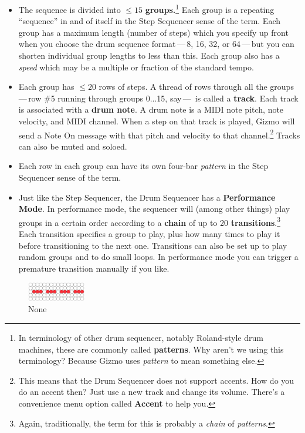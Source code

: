 \documentclass{article}
\begin{document}
\begin{itemize} 
\item The sequence is divided into \(\leq 15\) {\bf groups.}\footnote{In terminology of other drum sequencer, notably Roland-style drum machines, these are commonly called {\bf patterns}.  Why aren't we using this terminology?  Because Gizmo uses {\it pattern} to mean something else.} Each group is a repeating ``sequence'' in and of itself in the Step Sequencer sense of the term.  Each group has a maximum length (number of steps) which you specify up front when you choose the drum sequence format\,---\,8, 16, 32, or 64\,---\,but you can shorten individual group lengths to less than this.  Each group also has a {\it speed} which may be a multiple or fraction of the standard tempo.
\item Each group has \(\leq 20\) rows of steps.  A thread of rows through all the groups\,---\,row \#5 running through groups 0...15, say\,---\, is called a {\bf track}.  Each track is associated with a {\bf drum note}.  A drum note is a MIDI note pitch, note velocity, and MIDI channel.  When a step on that track is played, Gizmo will send a Note On message with that pitch and velocity to that channel.\footnote{This means that the Drum Sequencer does not support accents.  How do you do an accent then?  Just use a new track and change its volume.  There's a convenience menu option called {\bf Accent} to help you.} Tracks can also be muted and soloed.
\item Each row in each group can have its own four-bar {\it pattern} in the Step Sequencer sense of the term.
\item Just like the Step Sequencer, the Drum Sequencer has a {\bf Performance Mode}.  In performance mode, the sequencer will (among other things) play groups in a certain order according to a {\bf chain} of up to 20 {\bf transitions}.\footnote{Again, traditionally, the term for this is probably a {\it chain} of {\it patterns}.}  Each transition specifies a group to play, plus how many times to play it before transitioning to the next one.  Transitions can also be set up to play random groups and to do small loops.  In performance mode you can trigger a premature transition manually if you like.
\end{itemize}

\begin{figure}
\includegraphics[width=1in]{none.pdf}
\vspace{-2em}\caption{\small None}\vspace{-1em}
\end{figure}
\end{document}
